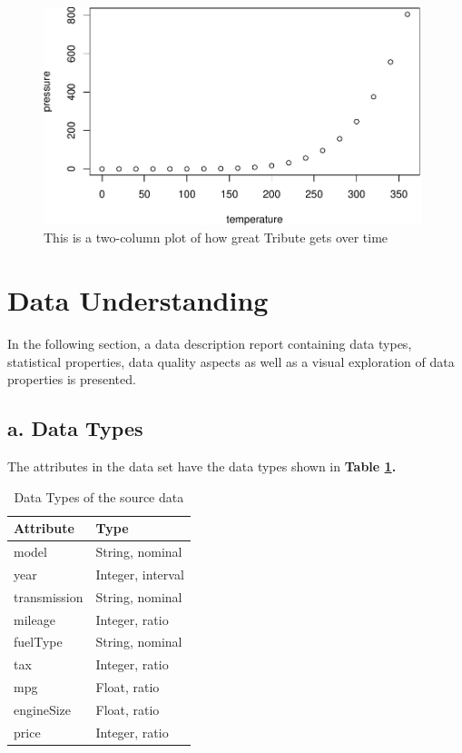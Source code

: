 \documentclass[sigchi]{acmart}
\begin{document}
\begin{figure}
\includegraphics[width=0.98\textwidth]{step6_files/figure-latex/two-col-tribute-plot-1} \caption{This is a two-column plot of how great Tribute gets over time}\label{fig:two-col-tribute-plot}
\end{figure}

\hypertarget{data-understanding}{%
\section{Data Understanding}\label{data-understanding}}

In the following section, a data description report containing data types, statistical properties, data quality aspects as well as a visual exploration of data properties is presented.

\hypertarget{a.-data-types}{%
\subsection{a. Data Types}\label{a.-data-types}}

The attributes in the data set have the data types shown in \textbf{Table \ref{tab:table-datatypes}.}

\begin{table}

\caption{\label{tab:table-datatypes}Data Types of the source data}
\centering
\begin{tabular}[t]{ll}
\toprule
Attribute & Type\\
\midrule
model & String, nominal\\
year & Integer, interval\\
transmission & String, nominal\\
mileage & Integer, ratio\\
fuelType & String, nominal\\
\addlinespace
tax & Integer, ratio\\
mpg & Float, ratio\\
engineSize & Float, ratio\\
price & Integer, ratio\\
\bottomrule
\end{tabular}
\end{table}
\end{document}
